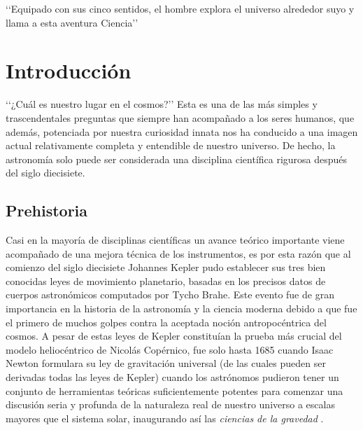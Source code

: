 

\begin{savequote}[50mm]
‘‘Equipado con sus cinco sentidos, el hombre explora el universo alrededor 
suyo y llama a esta aventura Ciencia’’
\end{savequote}


\chapter{Introducción}
\label{cha:Introduction}

 

‘‘¿Cuál es nuestro lugar en el cosmos?’’ Esta es una de las más simples
y trascendentales preguntas que siempre han acompañado a los seres humanos,
que además, potenciada por nuestra curiosidad innata nos ha conducido a
una imagen actual relativamente completa y entendible de nuestro universo.
De hecho, la astronomía solo puede ser considerada una disciplina científica
rigurosa después del siglo diecisiete.







\section{Prehistoria}
\label{sec:Prehistory}


Casi en la mayoría de disciplinas científicas un avance teórico importante
viene acompañado de una mejora técnica de los instrumentos, es por esta 
razón que al comienzo del siglo diecisiete Johannes Kepler pudo establecer
sus tres bien conocidas leyes de movimiento planetario, basadas en los 
precisos datos de cuerpos astronómicos computados por Tycho Brahe. Este 
evento fue de gran importancia en la historia de la astronomía y la ciencia 
moderna debido a que fue el primero de muchos golpes contra la aceptada
noción antropocéntrica del cosmos. A pesar de estas leyes de Kepler 
constituían la prueba más crucial del modelo heliocéntrico de Nicolás 
Copérnico, fue solo hasta 1685 cuando Isaac Newton formulara su ley de 
gravitación universal (de las cuales pueden ser derivadas todas las leyes
de Kepler) cuando los astrónomos pudieron tener un conjunto de herramientas
teóricas suficientemente potentes para comenzar una discusión seria y 
profunda de la naturaleza real de nuestro universo a escalas mayores que el 
sistema solar, inaugurando así las \textit{ciencias de la gravedad} 
\cite{longair2008}.


